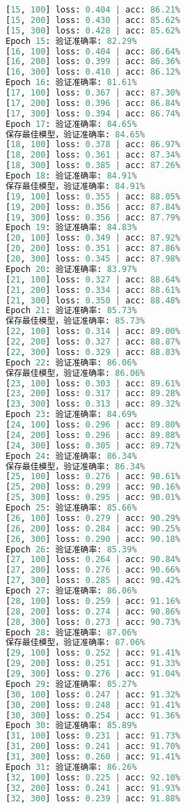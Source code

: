 \documentclass[UTF8]{report}
\theoremstyle{MyLineTheoremStyle} %
\theoremstyle{MyBlockTheoremStyle} %
\theoremstyle{MySubsubsectionStyle} %
\begin{document}
\begin{lstlisting}[language=python, caption={CNN训练结果一}, label={lst:cnn_train_result}]
[15, 100] loss: 0.404 | acc: 86.21%
[15, 200] loss: 0.430 | acc: 85.62%
[15, 300] loss: 0.428 | acc: 85.62%
Epoch 15: 验证准确率: 82.29%
[16, 100] loss: 0.404 | acc: 86.64%
[16, 200] loss: 0.399 | acc: 86.36%
[16, 300] loss: 0.410 | acc: 86.12%
Epoch 16: 验证准确率: 81.61%
[17, 100] loss: 0.367 | acc: 87.30%
[17, 200] loss: 0.396 | acc: 86.84%
[17, 300] loss: 0.394 | acc: 86.74%
Epoch 17: 验证准确率: 84.65%
保存最佳模型，验证准确率: 84.65%
[18, 100] loss: 0.378 | acc: 86.97%
[18, 200] loss: 0.361 | acc: 87.34%
[18, 300] loss: 0.385 | acc: 87.26%
Epoch 18: 验证准确率: 84.91%
保存最佳模型，验证准确率: 84.91%
[19, 100] loss: 0.355 | acc: 88.05%
[19, 200] loss: 0.356 | acc: 87.84%
[19, 300] loss: 0.356 | acc: 87.79%
Epoch 19: 验证准确率: 84.83%
[20, 100] loss: 0.349 | acc: 87.92%
[20, 200] loss: 0.351 | acc: 87.86%
[20, 300] loss: 0.345 | acc: 87.98%
Epoch 20: 验证准确率: 83.97%
[21, 100] loss: 0.327 | acc: 88.64%
[21, 200] loss: 0.334 | acc: 88.61%
[21, 300] loss: 0.350 | acc: 88.48%
Epoch 21: 验证准确率: 85.73%
保存最佳模型，验证准确率: 85.73%
[22, 100] loss: 0.314 | acc: 89.00%
[22, 200] loss: 0.327 | acc: 88.87%
[22, 300] loss: 0.329 | acc: 88.83%
Epoch 22: 验证准确率: 86.06%
保存最佳模型，验证准确率: 86.06%
[23, 100] loss: 0.303 | acc: 89.61%
[23, 200] loss: 0.317 | acc: 89.28%
[23, 300] loss: 0.313 | acc: 89.32%
Epoch 23: 验证准确率: 84.69%
[24, 100] loss: 0.296 | acc: 89.80%
[24, 200] loss: 0.296 | acc: 89.88%
[24, 300] loss: 0.305 | acc: 89.72%
Epoch 24: 验证准确率: 86.34%
保存最佳模型，验证准确率: 86.34%
[25, 100] loss: 0.276 | acc: 90.61%
[25, 200] loss: 0.299 | acc: 90.16%
[25, 300] loss: 0.295 | acc: 90.01%
Epoch 25: 验证准确率: 85.66%
[26, 100] loss: 0.279 | acc: 90.29%
[26, 200] loss: 0.284 | acc: 90.25%
[26, 300] loss: 0.290 | acc: 90.18%
Epoch 26: 验证准确率: 85.39%
[27, 100] loss: 0.264 | acc: 90.84%
[27, 200] loss: 0.276 | acc: 90.66%
[27, 300] loss: 0.285 | acc: 90.42%
Epoch 27: 验证准确率: 86.06%
[28, 100] loss: 0.259 | acc: 91.16%
[28, 200] loss: 0.274 | acc: 90.86%
[28, 300] loss: 0.273 | acc: 90.73%
Epoch 28: 验证准确率: 87.06%
保存最佳模型，验证准确率: 87.06%
[29, 100] loss: 0.252 | acc: 91.41%
[29, 200] loss: 0.251 | acc: 91.33%
[29, 300] loss: 0.276 | acc: 91.04%
Epoch 29: 验证准确率: 85.27%
[30, 100] loss: 0.247 | acc: 91.32%
[30, 200] loss: 0.248 | acc: 91.41%
[30, 300] loss: 0.254 | acc: 91.36%
Epoch 30: 验证准确率: 85.89%
[31, 100] loss: 0.231 | acc: 91.73%
[31, 200] loss: 0.241 | acc: 91.70%
[31, 300] loss: 0.260 | acc: 91.41%
Epoch 31: 验证准确率: 86.26%
[32, 100] loss: 0.225 | acc: 92.10%
[32, 200] loss: 0.241 | acc: 91.93%
[32, 300] loss: 0.239 | acc: 91.88%

\end{lstlisting}
\end{document}
